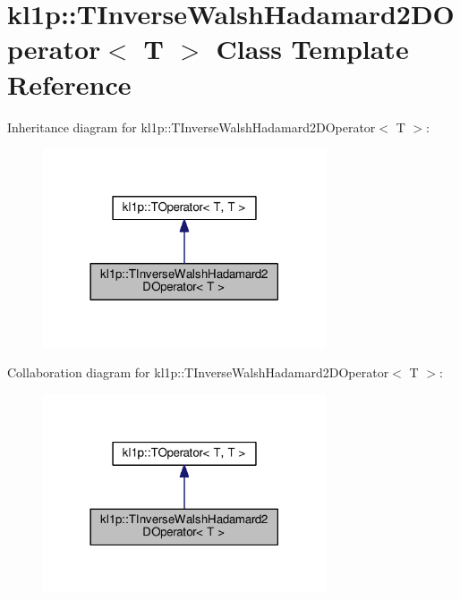 \hypertarget{classkl1p_1_1TInverseWalshHadamard2DOperator}{}\section{kl1p\+:\+:T\+Inverse\+Walsh\+Hadamard2\+D\+Operator$<$ T $>$ Class Template Reference}
\label{classkl1p_1_1TInverseWalshHadamard2DOperator}


Inheritance diagram for kl1p\+:\+:T\+Inverse\+Walsh\+Hadamard2\+D\+Operator$<$ T $>$\+:
\nopagebreak
\begin{figure}[H]
\begin{center}
\leavevmode
\includegraphics[width=237pt]{classkl1p_1_1TInverseWalshHadamard2DOperator__inherit__graph}
\end{center}
\end{figure}


Collaboration diagram for kl1p\+:\+:T\+Inverse\+Walsh\+Hadamard2\+D\+Operator$<$ T $>$\+:
\nopagebreak
\begin{figure}[H]
\begin{center}
\leavevmode
\includegraphics[width=237pt]{classkl1p_1_1TInverseWalshHadamard2DOperator__coll__graph}
\end{center}
\end{figure}
